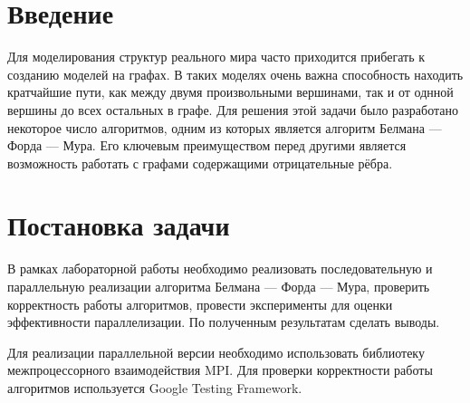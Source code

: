 \documentclass{report}
\begin{document}
\setcounter{page}{2}

\tableofcontents
\newpage

\section*{Введение}
Для моделирования структур реального мира часто приходится прибегать к созданию моделей на графах. В таких моделях очень важна способность находить кратчайшие пути, как между двумя произвольными вершинами, так и от однной вершины до всех остальных в графе. Для решения этой задачи было разработано некоторое число алгоритмов, одним из которых является алгоритм Белмана — Форда — Мура. Его ключевым преимуществом перед другими является возможность работать с графами содержащими отрицательные рёбра.

\newpage

\section*{Постановка задачи}
В рамках лабораторной работы необходимо реализовать последовательную и параллельную реализации алгоритма Белмана — Форда — Мура, проверить корректность работы алгоритмов, провести эксперименты для оценки эффективности параллелизации. По полученным результатам сделать выводы.
\par Для реализации параллельной версии необходимо использовать библиотеку межпроцессорного взаимодействия MPI. Для проверки корректности работы алгоритмов используется Google Testing Framework.
\newpage

\end{document}
